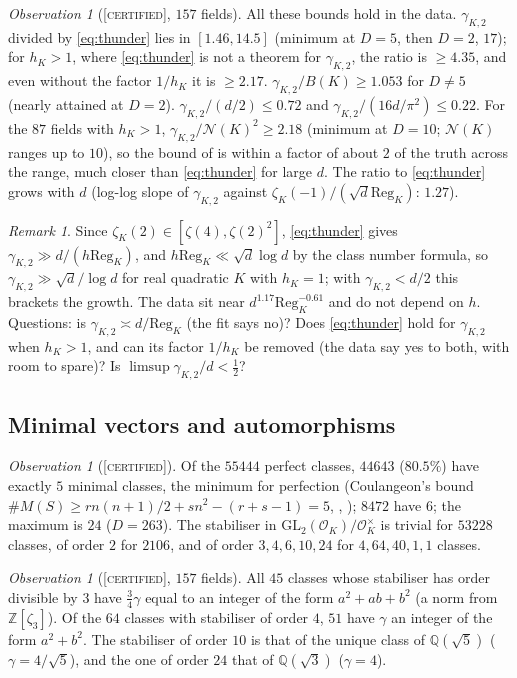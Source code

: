 \documentclass[11pt]{amsart}
\theoremstyle{definition}
\theoremstyle{remark}
\newtheorem{remark}[theorem]{Remark}
\newtheorem{observation}[theorem]{Observation}
\newcommand{\Q}{\mathbb{Q}}
\newcommand{\Z}{\mathbb{Z}}
\newcommand{\OK}{\mathcal{O}_K}
\newcommand{\GL}{\mathrm{GL}}
\newcommand{\Reg}{\mathrm{Reg}_K}
\newcommand{\gK}{\gamma_{K,2}}
\newcommand{\CERT}{\textsc{[certified]}}
\begin{document}
\begin{observation}[\CERT, $157$ fields]\label{obs:bounds}
All these bounds hold in the data.  $\gK$ divided by \eqref{eq:thunder} lies in $[1.46,14.5]$
(minimum at $D=5$, then $D=2$, $17$); for $h_K>1$, where \eqref{eq:thunder} is not a theorem
for $\gK$, the ratio is $\ge4.35$, and even without the factor $1/h_K$ it is $\ge2.17$.  $\gK/B(K)\ge1.053$ for $D\ne5$ (nearly attained at $D=2$).
$\gK/(d/2)\le0.72$ and $\gK/(16d/\pi^2)\le0.22$.  For the $87$ fields with $h_K>1$,
$\gK/\mathcal N(K)^2\ge2.18$ (minimum at $D=10$; $\mathcal N(K)$ ranges up to $10$), so the bound
of \cite{BI04} is within a factor of about $2$ of the truth across the range, much closer than
\eqref{eq:thunder} for large $d$.  The ratio to \eqref{eq:thunder} grows with $d$
(log-log slope of $\gK$ against $\zeta_K(-1)/(\sqrt d\Reg)$: $1.27$).
\end{observation}

\begin{remark}
Since $\zeta_K(2)\in[\zeta(4),\zeta(2)^2]$, \eqref{eq:thunder} gives
$\gK\gg d/(h\Reg)$, and $h\Reg\ll\sqrt d\log d$ by the class number formula, so
$\gK\gg\sqrt d/\log d$ for real quadratic $K$ with $h_K=1$; with $\gK<d/2$ this brackets the growth.  The
data sit near $d^{1.17}\Reg^{-0.61}$ and do not depend on $h$.  Questions: is $\gK\asymp d/\Reg$
(the fit says no)?  Does \eqref{eq:thunder} hold for $\gK$ when $h_K>1$, and can its factor
$1/h_K$ be removed (the data say yes to both, with room to spare)?  Is $\limsup\gK/d<\tfrac12$?
\end{remark}

\subsection{Minimal vectors and automorphisms}\label{subsec:aut}
\begin{observation}[\CERT]
Of the $55444$ perfect classes, $44643$ ($80.5\%$) have exactly $5$ minimal classes, the minimum
for perfection (Coulangeon's bound $\#M(S)\ge rn(n+1)/2+sn^2-(r+s-1)=5$, \cite[(2--1)]{CIO},
\cite[Cor.~4]{PW05}); $8472$ have $6$; the maximum is $24$ ($D=263$).  The stabiliser in
$\GL_2(\OK)/\OK^\times$ is trivial for $53228$ classes, of order $2$ for $2106$, and of order
$3,4,6,10,24$ for $4,64,40,1,1$ classes.
\end{observation}

\begin{observation}[\CERT, $157$ fields]\label{obs:cm}
All $45$ classes whose stabiliser has order divisible by $3$ have $\tfrac34\gamma$ equal to an
integer of the form $a^2+ab+b^2$ (a norm from $\Z[\zeta_3]$).  Of the $64$ classes with stabiliser of
order $4$, $51$ have $\gamma$ an integer of the form $a^2+b^2$.  The stabiliser of order $10$ is
that of the unique class of $\Q(\sqrt5)$ ($\gamma=4/\sqrt5$), and the one of order $24$ that of
$\Q(\sqrt3)$ ($\gamma=4$).
\end{observation}
\end{document}
